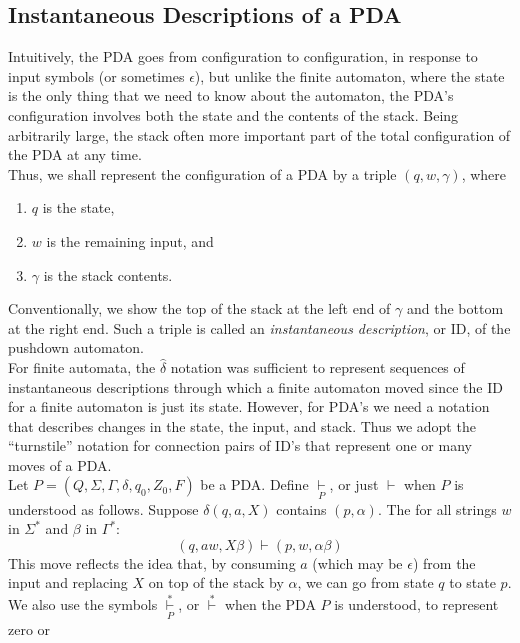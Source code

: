 \documentclass[]{article}
\begin{document}
  \subsection*{Instantaneous Descriptions of a PDA}
    Intuitively, the PDA goes from configuration to configuration, in response
    to input symbols (or sometimes $\epsilon$), but unlike the finite automaton,
    where the state is the only thing that we need to know about the automaton,
    the PDA's configuration involves both the state and the contents of the
    stack. Being arbitrarily large, the stack often more important part of the
    total configuration of the PDA at any time. \\
    \indent Thus, we shall represent the configuration of a PDA by a triple
    $(q,w,\gamma)$, where
      \begin{enumerate}
        \item $q$ is the state,
        \item $w$ is the remaining input, and
        \item $\gamma$ is the stack contents.
      \end{enumerate}
    Conventionally, we show the top of the stack at the left end of $\gamma$ and
    the bottom at the right end. Such a triple is called an \emph{instantaneous
    description}, or ID, of the pushdown automaton. \\
    \indent For finite automata, the $\hat{\delta}$ notation was sufficient to
    represent sequences of instantaneous descriptions through which a finite
    automaton moved since the ID for a finite automaton is just its state.
    However, for PDA's we need a notation that describes changes in the state,
    the input, and stack. Thus we adopt the ``turnstile'' notation for
    connection pairs of ID's that represent one or many moves of a PDA. \\
    \indent Let $P = (Q,\Sigma,\Gamma,\delta,q_0,Z_0,F)$ be a PDA. Define
    $\underset{P}{\vdash}$, or just $\vdash$ when $P$ is understood as follows.
    Suppose $\delta(q,a,X)$ contains $(p,\alpha)$. The for all strings $w$ in
    $\Sigma^*$ and $\beta$ in $\Gamma^*$:
      \[ (q,aw,X\beta)\vdash(p,w,\alpha\beta) \]
    This move reflects the idea that, by consuming $a$ (which may be $\epsilon$)
    from the input and replacing $X$ on top of the stack by $\alpha$, we can go
    from state $q$ to state $p$. \\
    \indent We also use the symbols $\underset{P}{\overset{*}{\vdash}}$, or $
    \overset{*}{\vdash}$ when the PDA $P$ is understood, to represent zero or
\end{document}
